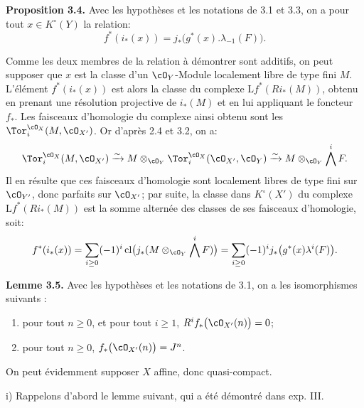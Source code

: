 \textbf{Proposition 3.4.} Avec les hypothèses et les notations de 3.1 et 3.3, on a pour tout \(x\in K^\circ(Y)\) la relation:
\[
f^*(i_*(x))=j_*\bigl(g^*(x).\lambda_{-1}(F)\bigr).
\]

Comme les deux membres de la relation à démontrer sont additifs, on peut supposer que \(x\) est la classe d'un \(\cO_Y\)-Module localement libre de type fini \(M\). L'élément \(f^*(i_*(x))\) est alors la classe du complexe \(\mathrm Lf^*(Ri_*(M))\), obtenu en prenant une résolution projective de \(i_*(M)\) et en lui appliquant le foncteur \(f_*\). Les faisceaux d'homologie du complexe ainsi obtenu sont les \(\Tor_i^{\cO_X}(M,\cO_{X'})\). Or d'après 2.4 et 3.2, on a:
\[
\Tor_i^{\cO_X}(M,\cO_{X'})
\xrightarrow{\sim}
M\otimes_{\cO_Y}\Tor_i^{\cO_X}(\cO_{X'},\cO_Y)
\xrightarrow{\sim}
M\otimes_{\cO_Y}\bigwedge^iF.
\]
Il en résulte que ces faisceaux d'homologie sont localement libres de type fini sur \(\cO_{Y'}\), donc parfaits sur \(\cO_{X'}\); par suite, la classe dans \(K^\circ(X')\) du complexe \(\mathrm Lf^*(Ri_*(M))\) est la somme alternée des classes de ses faisceaux d'homologie, soit:
\[
f^*(i_*(x))
=\sum_{i\ge0}(-1)^i\operatorname{cl}
\bigl(j_*(M\otimes_{\cO_Y}\bigwedge^iF)\bigr)
=\sum_{i\ge0}(-1)^i
j_*\bigl(g^*(x)\lambda^i(F)\bigr).
\]

\textbf{Lemme 3.5.} Avec les hypothèses et les notations de 3.1, on a les isomorphismes suivants :
\begin{enumerate}[label=\roman*)]
\item pour tout \(n\ge0\), et pour tout \(i\ge1\), \(R^if_*\bigl(\cO_{X'}(n)\bigr)=0\);
\item pour tout \(n\ge0\), \(f_*\bigl(\cO_{X'}(n)\bigr)=J^n\).
\end{enumerate}
On peut évidemment supposer \(X\) affine, donc quasi-compact.

i) Rappelons d'abord le lemme suivant, qui a été démontré dans exp. III.

